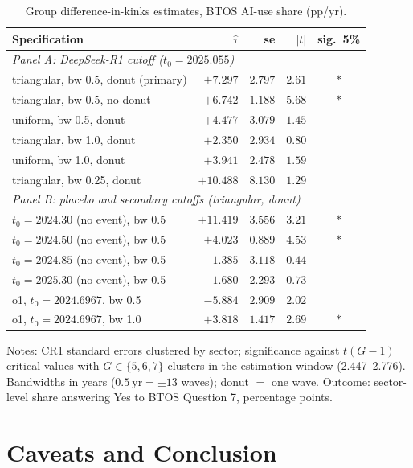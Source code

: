 \documentclass[11pt]{article}
\begin{document}
\begin{table}[t]
\centering
\small
\caption{Group difference-in-kinks estimates, BTOS AI-use share (pp/yr).}
\label{tab:dik}
\begin{tabular}{lrrrc}
\toprule
Specification & $\hat\tau$ & se & $|t|$ & sig.\ 5\% \\
\midrule
\multicolumn{5}{l}{\emph{Panel A: DeepSeek-R1 cutoff ($t_0=2025.055$)}}\\
triangular, bw 0.5, donut (primary) & $+7.297$ & $2.797$ & $2.61$ & $\ast$ \\
triangular, bw 0.5, no donut        & $+6.742$ & $1.188$ & $5.68$ & $\ast$ \\
uniform, bw 0.5, donut              & $+4.477$ & $3.079$ & $1.45$ &  \\
triangular, bw 1.0, donut           & $+2.350$ & $2.934$ & $0.80$ &  \\
uniform, bw 1.0, donut              & $+3.941$ & $2.478$ & $1.59$ &  \\
triangular, bw 0.25, donut          & $+10.488$ & $8.130$ & $1.29$ &  \\
\midrule
\multicolumn{5}{l}{\emph{Panel B: placebo and secondary cutoffs (triangular, donut)}}\\
$t_0=2024.30$ (no event), bw 0.5    & $+11.419$ & $3.556$ & $3.21$ & $\ast$ \\
$t_0=2024.50$ (no event), bw 0.5    & $+4.023$ & $0.889$ & $4.53$ & $\ast$ \\
$t_0=2024.85$ (no event), bw 0.5    & $-1.385$ & $3.118$ & $0.44$ &  \\
$t_0=2025.30$ (no event), bw 0.5    & $-1.680$ & $2.293$ & $0.73$ &  \\
o1, $t_0=2024.6967$, bw 0.5         & $-5.884$ & $2.909$ & $2.02$ &  \\
o1, $t_0=2024.6967$, bw 1.0         & $+3.818$ & $1.417$ & $2.69$ & $\ast$ \\
\bottomrule
\end{tabular}

\medskip
\parbox{0.92\textwidth}{\footnotesize Notes: CR1 standard errors clustered by
sector; significance against $t(G-1)$ critical values with $G \in \{5,6,7\}$
clusters in the estimation window (2.447--2.776). Bandwidths in years
($0.5\ \text{yr} = \pm 13$ waves); donut $=$ one wave. Outcome: sector-level
share answering Yes to BTOS Question 7, percentage points.}
\end{table}

\section{Caveats and Conclusion}\label{sec:conclusion}
\end{document}
